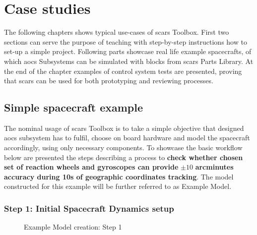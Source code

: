 \section{Case studies}\label{sec:examples}
    The following chapters shows typical use-cases of \ac{scars} Toolbox. First two sections can serve the purpose of teaching with step-by-step instructions how to set-up a simple project. Following parts showcase real life example spacecrafts, of which \ac{aocs} Subsystems can be simulated with blocks from \ac{scars} Parts Library. At the end of the chapter examples of control system tests are presented, proving that \ac{scars} can be used for both prototyping and reviewing processes.


    \subsection{Simple spacecraft example}\label{sec:simple_spacecraft}
        The nominal usage of \ac{scars} Toolbox is to take a simple objective that designed \ac{aocs} subsystem has to fulfil, choose on board hardware and model the spacecraft accordingly, using only necessary components. To showcase the basic workflow below are presented the steps describing a process to \textbf{check whether chosen set of reaction wheels and gyroscopes can provide} $\pm10$ \textbf{arcminutes accuracy during 10s of geographic coordinates tracking}. The model constructed for this example will be further referred to as Example Model. 

        \subsubsection*{Step 1: Initial Spacecraft Dynamics setup}
            \begin{figure}[H]
                \centering
                \qquad
                \caption{Example Model creation: Step 1}%
                \label{fig:step1}%
            \end{figure}

